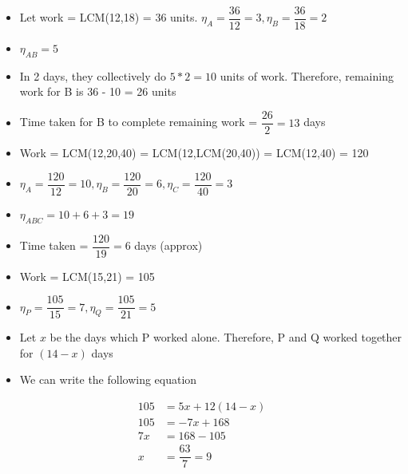 
\begin{itemize}
    \item Let work = LCM(12,18) = 36 units. $\eta_A = \dfrac{36}{12} = 3, \eta_B = \dfrac{36}{18} = 2$
    \item $\eta_{AB} = 5$
    \item In 2 days, they collectively do $5 * 2 = 10$ units of work. Therefore, remaining work for B is 36 - 10 = 26 units
    \item Time taken for B to complete remaining work = $\dfrac{26}{2} = 13$ days
\end{itemize}


\begin{itemize}
    \item Work = LCM(12,20,40) = LCM(12,LCM(20,40)) = LCM(12,40) = 120
    \item $\eta_A = \dfrac{120}{12} = 10, \eta_B = \dfrac{120}{20} = 6, \eta_C = \dfrac{120}{40} = 3$
    \item $\eta_{ABC} = 10 + 6 + 3 = 19$
    \item Time taken = $\dfrac{120}{19} = 6$ days (approx)
\end{itemize}


\begin{itemize}
    \item Work = LCM(15,21) = 105
    \item $\eta_P = \dfrac{105}{15} = 7, \eta_Q = \dfrac{105}{21} = 5$
    \item Let $x$ be the days which P worked alone. Therefore, P and Q worked together for $(14 - x)$ days
    \item We can write the following equation
\end{itemize}

\begin{align*}
    105 &= 5x + 12 (14 - x) \\
    105 &= -7x + 168 \\
    7x &= 168 - 105 \\
    x &= \dfrac{63}{7} = 9
\end{align*}

